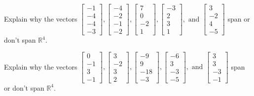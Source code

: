 \documentclass{article}
\begin{document}
\begin{exerciseStatement}
    Explain why the vectors \(\left[\begin{array}{r}
-1 \\
-4 \\
-4 \\
-3
\end{array}\right] , \left[\begin{array}{r}
-4 \\
-2 \\
-1 \\
-2
\end{array}\right] , \left[\begin{array}{r}
7 \\
0 \\
-2 \\
1
\end{array}\right] , \left[\begin{array}{r}
-3 \\
2 \\
3 \\
1
\end{array}\right] , \text{ and } \left[\begin{array}{r}
3 \\
-2 \\
4 \\
-5
\end{array}\right]\) span or don't span \(\mathbb{R}^4\).



  
\end{exerciseStatement}

\begin{exerciseStatement}
    Explain why the vectors \(\left[\begin{array}{r}
0 \\
-1 \\
3 \\
-1
\end{array}\right] , \left[\begin{array}{r}
3 \\
-2 \\
3 \\
2
\end{array}\right] , \left[\begin{array}{r}
-9 \\
9 \\
-18 \\
-3
\end{array}\right] , \left[\begin{array}{r}
-6 \\
3 \\
-3 \\
-5
\end{array}\right] , \text{ and } \left[\begin{array}{r}
3 \\
3 \\
-3 \\
-1
\end{array}\right]\) span or don't span \(\mathbb{R}^4\).



  
\end{exerciseStatement}
\end{document}
